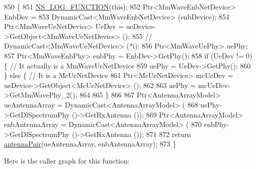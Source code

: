 \begin{DoxyCode}
850 \{
851         \hyperlink{log-macros-disabled_8h_a90b90d5bad1f39cb1b64923ea94c0761}{NS\_LOG\_FUNCTION}(\textcolor{keyword}{this});
852         Ptr<MmWaveEnbNetDevice> EnbDev =
853                                 DynamicCast<MmWaveEnbNetDevice> (enbDevice);
854         Ptr<MmWaveUeNetDevice> UeDev = ueDevice->GetObject<MmWaveUeNetDevice> ();
855                                                 \textcolor{comment}{// DynamicCast<MmWaveUeNetDevice> (*i);}
856         Ptr<MmWaveUePhy> uePhy;
857         Ptr<MmWaveEnbPhy> enbPhy = EnbDev->GetPhy();
858         \textcolor{keywordflow}{if} (UeDev != 0) \{ \textcolor{comment}{// It actually is a MmWaveUeNetDevice}
859                 uePhy = UeDev->GetPhy();
860         \} \textcolor{keywordflow}{else} \{ \textcolor{comment}{// It is a McUeNetDevice}
861                 Ptr<McUeNetDevice> mcUeDev = ueDevice->GetObject<McUeNetDevice> ();
862 
863                 uePhy = mcUeDev->GetMmWavePhy\_2();
864 
865         \}
866 
867         Ptr<AntennaArrayModel> ueAntennaArray = DynamicCast<AntennaArrayModel> (
868                                                                                                                 
      uePhy->GetDlSpectrumPhy ()->GetRxAntenna ());
869         Ptr<AntennaArrayModel> enbAntennaArray = DynamicCast<AntennaArrayModel> (
870                                                                                                                 
      enbPhy->GetDlSpectrumPhy ()->GetRxAntenna ());
871 
872         \textcolor{keywordflow}{return} \hyperlink{namespacens3_aa7da494dc75bd8e5232a27429c48a195}{antennaPair}(ueAntennaArray, enbAntennaArray);
873 \}
\end{DoxyCode}


Here is the caller graph for this function\+:


